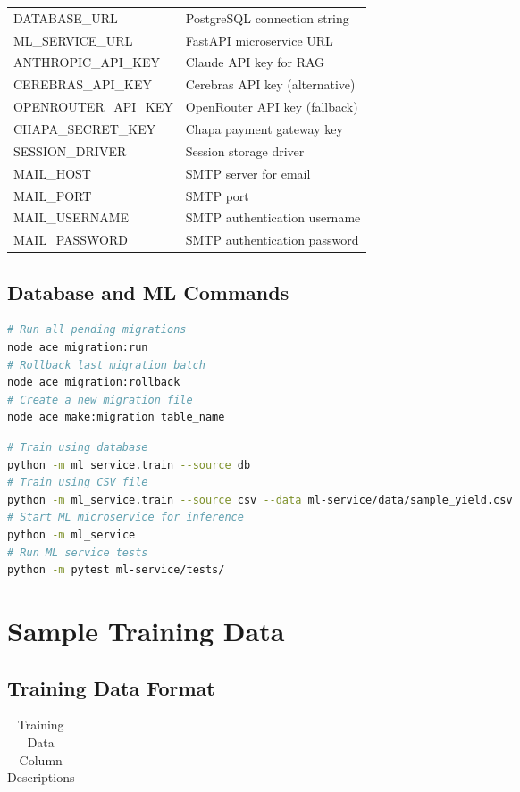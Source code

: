 \documentclass[12pt,a4paper,oneside]{report}
\begin{document}
\begin{appendix}
\begin{longtable}{ll}
\endhead

\endfoot

\endlastfoot
DATABASE\_URL & PostgreSQL connection string \\
ML\_SERVICE\_URL & FastAPI microservice URL \\
ANTHROPIC\_API\_KEY & Claude API key for RAG \\
CEREBRAS\_API\_KEY & Cerebras API key (alternative) \\
OPENROUTER\_API\_KEY & OpenRouter API key (fallback) \\
CHAPA\_SECRET\_KEY & Chapa payment gateway key \\
SESSION\_DRIVER & Session storage driver \\
MAIL\_HOST & SMTP server for email \\
MAIL\_PORT & SMTP port \\
MAIL\_USERNAME & SMTP authentication username \\
MAIL\_PASSWORD & SMTP authentication password \\
\end{longtable}

\section{Database and ML Commands}
\begin{lstlisting}[caption=Database Migration Commands,language=bash]
# Run all pending migrations
node ace migration:run
# Rollback last migration batch
node ace migration:rollback
# Create a new migration file
node ace make:migration table_name
\end{lstlisting}

\begin{lstlisting}[caption=ML Service Training Commands,language=bash]
# Train using database
python -m ml_service.train --source db
# Train using CSV file
python -m ml_service.train --source csv --data ml-service/data/sample_yield.csv
# Start ML microservice for inference
python -m ml_service
# Run ML service tests
python -m pytest ml-service/tests/
\end{lstlisting}

\clearpage
\chapter{Sample Training Data}
\label{app:data}

\section{Training Data Format}
\begin{longtable}{ll}
\caption{Training Data Column Descriptions} \\


\end{longtable}
\end{appendix}
\end{document}
